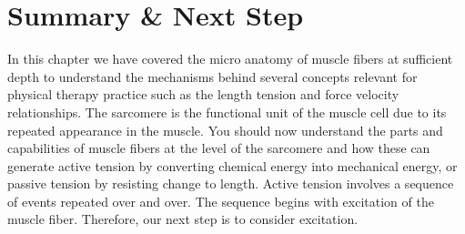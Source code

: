 \section{Summary \& Next Step}

In this chapter we have covered the micro anatomy of muscle fibers at sufficient depth to understand the mechanisms behind several concepts relevant for physical therapy practice such as the length tension and force velocity relationships. The sarcomere is the functional unit of the muscle cell due to its repeated appearance in the muscle.  You should now understand the parts and capabilities of muscle fibers at the level of the sarcomere and how these can generate active tension by converting chemical energy into mechanical energy, or passive tension by resisting change to length. Active tension involves a sequence of events repeated over and over. The sequence begins with excitation of the muscle fiber. Therefore, our next step is to consider excitation.

\printbibliography[heading=subbibintoc]

